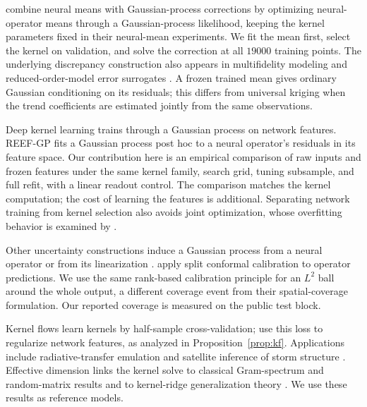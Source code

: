\documentclass[twoside,11pt]{article}
\begin{document}
\citet{mora2025operator} combine neural means with Gaussian-process
corrections by optimizing neural-operator means through a
Gaussian-process likelihood, keeping the kernel parameters fixed in their
neural-mean experiments. We fit the mean first, select the kernel on
validation, and solve
the correction at all $19000$ training points. The underlying discrepancy
construction also appears in multifidelity modeling
\citep{kennedy2000predicting} and reduced-order-model error surrogates
\citep{drohmann2015romes}. A frozen trained mean gives ordinary Gaussian
conditioning on its residuals; this differs from universal kriging when
the trend coefficients are estimated jointly from the same observations.

Deep kernel learning \citep{wilson2016deep,calandra2016manifold} trains through a
Gaussian process on network features. REEF-GP \citep{vendrell2026geometry}
fits a Gaussian process post hoc to a neural operator's residuals in its
feature space. Our contribution here is an empirical comparison of raw
inputs and frozen features under the same kernel family, search grid,
tuning subsample, and full refit, with a linear readout control. The comparison matches the kernel computation; the cost of learning the features is additional.
Separating network training from kernel selection also avoids joint
optimization, whose overfitting behavior is examined by
\citet{ober2021promises}.

Other uncertainty constructions induce a Gaussian process from a neural
operator \citep{kumar2024neural} or from its linearization
\citep{magnani2025linearization}. \citet{ma2024calibrated} apply split
conformal calibration to operator predictions. We use the same rank-based
calibration principle for an $L^2$ ball around the whole output, a different
coverage event from their spatial-coverage formulation. Our reported
coverage is measured on the public test block.

Kernel flows
\citep{owhadi2019kernel} learn kernels by half-sample cross-validation;
\citet{yoo2021deep} use this loss to regularize network features, as analyzed
in Proposition~\ref{prop:kf}. Applications include radiative-transfer
emulation \citep{susiluoto2025radiative} and satellite inference of storm
structure \citep{prasanth2021kernel}. Effective dimension links the kernel
solve to classical Gram-spectrum and random-matrix results
\citep{koltchinskii2000random,marchenko1967distribution,baik2005phase}
and to kernel-ridge generalization theory \citep{caponnetto2007optimal}.
We use these results as reference models.
\end{document}

